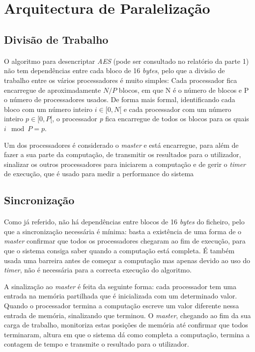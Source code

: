 \section{Arquitectura de Paralelização}

\subsection{Divisão de Trabalho}
\paragraph{}
O algoritmo para desencriptar \textit{AES} (pode ser consultado no relatório da parte 1) não tem dependências entre cada bloco de 16 \textit{bytes}, pelo que a divisão de trabalho entre os vários processadores é muito simples: Cada processador fica encarregue de aproximadamente $N/P$ blocos, em que N é o número de blocos e P o número de processadores usados. De forma mais formal, identificando cada bloco com um número inteiro $i \in [0,N[$ e cada processador com um número inteiro $p \in [0,P[$, o processador \textit{p} fica encarregue de todos os blocos para os quais $i \mod P  = p$.

Um dos processadores é considerado o \textit{master} e está encarregue, para além de fazer a sua parte da computação, de transmitir os resultados para o utilizador, sinalizar os outros processadores para iniciarem a computação e de gerir o \textit{timer} de execução, que é usado para medir a performance do sistema


\subsection{Sincronização}
\paragraph{}
Como já referido, não há dependências entre blocos de 16 \textit{bytes} do ficheiro, pelo que a sincronização necessária é mínima: basta a existência de uma forma de o \textit{master} confirmar que todos os processadores chegaram ao fim de execução, para que o sistema consiga saber quando a computação está completa. 
É também usada uma barreira antes de começar a computação mas apenas devido ao uso do \textit{timer}, não é necessária para a correcta execução do algoritmo.

A sinalização ao \textit{master} é feita da seguinte forma: cada processador tem uma entrada na memória partilhada que é inicializada com um determinado valor. Quando o processador termina a computação escreve um valor diferente nessa entrada de memória, sinalizando que terminou. O \textit{master}, chegando ao fim da sua carga de trabalho, monitoriza estas posições de memória até confirmar que todos terminaram, altura em que o sistema dá como completa a computação, termina a contagem de tempo e transmite o resultado para o utilizador.